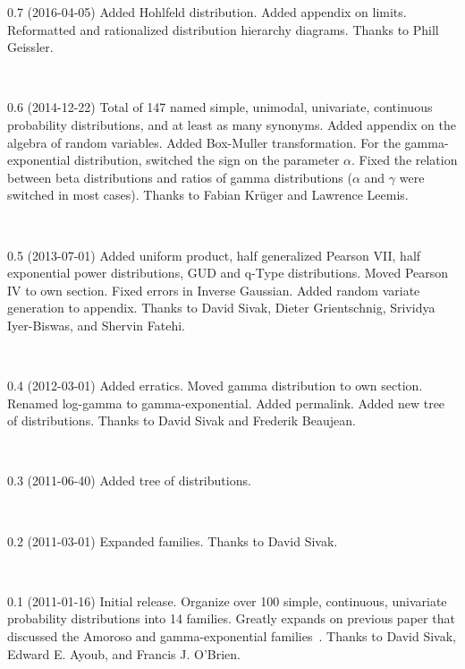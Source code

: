 {0.7 (2016-04-05) 
%
Added Hohlfeld distribution. %
Added appendix on limits.
Reformatted and rationalized distribution hierarchy diagrams. 
Thanks to Phill Geissler.

~

0.6 (2014-12-22)
%
Total of 147 named simple, unimodal, univariate, continuous probability distributions, and at least as many synonyms.
Added appendix on the algebra of random variables.
Added Box-Muller transformation.
For the gamma-exponential distribution, switched the sign on the parameter $\alpha$.
Fixed the relation between beta distributions and ratios of gamma distributions ($\alpha$ and $\gamma$ were switched in most cases).
Thanks to Fabian Kr\"uger and Lawrence Leemis.


~


0.5 (2013-07-01)
Added uniform product, half generalized Pearson VII, half exponential power distributions, GUD and q-Type distributions. 
Moved Pearson IV to own section.
Fixed errors in Inverse Gaussian.
Added random variate generation to appendix.
Thanks to David Sivak, Dieter Grientschnig, Srividya Iyer-Biswas, and Shervin Fatehi.

~

 0.4 (2012-03-01) 
Added erratics. 
Moved gamma distribution to own section.
Renamed log-gamma to gamma-exponential.
Added permalink.
Added new tree of distributions. 
Thanks to David Sivak and Frederik Beaujean.

~

0.3 (2011-06-40) 
Added tree of distributions. 

~

0.2 (2011-03-01) 
Expanded families.  
Thanks to David Sivak. 

~

 0.1 (2011-01-16)
 Initial release. Organize over 100  simple, continuous, univariate probability distributions into 14 families. Greatly expands on previous paper that discussed the Amoroso and gamma-exponential families~\cite{_amoroso}. Thanks to David Sivak, Edward E. Ayoub, and Francis J. O'Brien.

}



\normalstretch
\newpage ~\newpage

